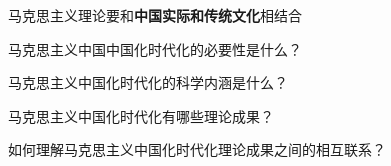 \begin{notation}
    马克思主义理论要和\textbf{中国实际和传统文化}相结合
\end{notation}
\begin{question}
    马克思主义中国中国化时代化的必要性是什么？

    马克思主义中国化时代化的科学内涵是什么？

    马克思主义中国化时代化有哪些理论成果？

    如何理解马克思主义中国化时代化理论成果之间的相互联系？
\end{question}
